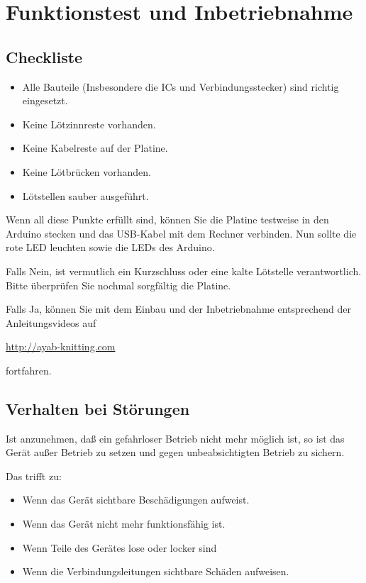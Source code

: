 \documentclass[fleqn,10pt]{SelfArx} %
\begin{document}

\section{Funktionstest und Inbetriebnahme}

\subsection*{Checkliste}

\begin{itemize}[noitemsep] %
\item[\CheckedBox] Alle Bauteile (Insbesondere die ICs und Verbindungsstecker) sind richtig eingesetzt.
\item[\CheckedBox] Keine Lötzinnreste vorhanden.
\item[\CheckedBox] Keine Kabelreste auf der Platine.
\item[\CheckedBox] Keine Lötbrücken vorhanden.
\item[\CheckedBox] Lötstellen sauber ausgeführt.
\end{itemize}

Wenn all diese Punkte erfüllt sind, können Sie die Platine testweise in den Arduino stecken und das USB-Kabel mit dem Rechner verbinden. Nun sollte die rote LED leuchten sowie die LEDs des Arduino.

Falls Nein, ist vermutlich ein Kurzschluss oder eine kalte Lötstelle verantwortlich. Bitte überprüfen Sie nochmal sorgfältig die Platine.

Falls Ja, können Sie mit dem Einbau und der Inbetriebnahme entsprechend der Anleitungsvideos auf

\url{http://ayab-knitting.com}

fortfahren.

\subsection*{Verhalten bei Störungen}

Ist anzunehmen, daß ein gefahrloser Betrieb nicht mehr möglich ist, so ist das Gerät außer Betrieb zu setzen und gegen unbeabsichtigten Betrieb zu sichern.

Das trifft zu:

\begin{itemize}[noitemsep] %
\item Wenn das Gerät sichtbare Beschädigungen aufweist.
\item Wenn das Gerät nicht mehr funktionsfähig ist.
\item Wenn Teile des Gerätes lose oder locker sind
\item Wenn die Verbindungsleitungen sichtbare Schäden aufweisen.
\end{itemize}
\end{document}

